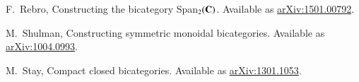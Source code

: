 \documentclass[oneside]{amsart}
\theoremstyle{definition}
\theoremstyle{remark}
\numberwithin{equation}{section}
\begin{document}
\begin{thebibliography}{100}







 F.\ Rebro, Constructing the bicategory Span$_{2}(\bold{C})$. Available as \href{https://arxiv.org/abs/1501.00792}{arXiv:1501.00792}.

    M.\ Shulman, Constructing symmetric monoidal bicategories. Available as \href{http://arxiv.org/abs/1004.0993}{arXiv:1004.0993}.

    M.\ Stay, Compact closed bicategories. Available as \href{http://arxiv.org/abs/1301.1053}{arXiv:1301.1053}.


  


	

\end{thebibliography}
\end{document}
